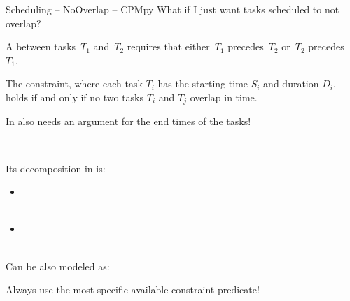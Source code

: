\documentclass{cons-beamer}
\begin{document}
\begin{flashcardcpmpy}
\begin{frame}{Scheduling -- NoOverlap -- CPMpy}
  What if I just want tasks scheduled to not overlap?
    
  A  between tasks~$T_1$ and~$T_2$
  requires that \alert{either}~$T_1$ precedes~$T_2$
  \alert{or}~$T_2$ precedes~$T_1$.
  
  \begin{definition}[Carlier, 1982]
    The  constraint, where each task
    $T_i$ has the starting time $S_i$ and
    duration $D_i$, holds if and only if no two tasks $T_i$ and $T_j$ overlap in time.
  \end{definition}

  In \CPMpy {} also needs an argument for the end times of the tasks!

  $ $

  Its decomposition in \CPMpy is:
  \begin{itemize}
    \item {} \\
      ~~ 
    \item {} \\
      ~~ 
  \end{itemize}
  \vfill
    
  Can be also modeled as: 
    
  \alert{Always use the most specific available constraint predicate!}
\end{frame}
\end{flashcardcpmpy}


\subsection{}
\end{document}
